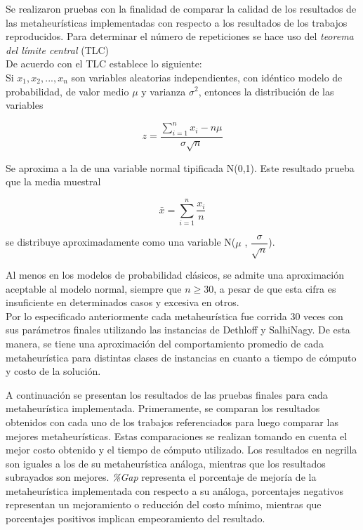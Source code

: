 Se realizaron pruebas con la finalidad de comparar la calidad de los resultados de las metaheurísticas im\-ple\-men\-ta\-das con respecto a los resultados de los trabajos reproducidos. Para determinar el número de repeticiones se hace uso del \textit{teorema del límite central} (TLC)\\

De acuerdo con \cite{TCL} el TLC establece lo siguiente:\\

Si $x_1,x_2,...,x_n$ son variables aleatorias independientes, con idéntico modelo de probabilidad, de valor medio $\mu$ y varianza $\sigma^2$, entonces la distribución de las variables 

\begin{equation}
z = \dfrac{\sum_{i=1}^n x_i - n \mu}{\sigma\sqrt{n}}
\end{equation}

Se aproxima a la de una variable normal tipificada N(0,1). Este resultado prueba que la media muestral 

\begin{equation}
\bar{x} = \sum_{i=1}^n \dfrac{x_i}{n}
\end{equation}

se distribuye aproximadamente como una variable N($\mu$ , $\dfrac{\sigma}{\sqrt{n}}$).

Al menos en los modelos de probabilidad clásicos, se admite una aproximación aceptable al modelo normal, siempre que $n \geqslant 30$, a pesar de que esta cifra es insuficiente en determinados casos y excesiva en otros.\\

Por lo especificado anteriormente cada metaheurística fue corrida 30 veces con sus parámetros finales utilizando las instancias de Dethloff y SalhiNagy. De esta manera, se tiene una aproximación del comportamiento promedio de cada metaheurística para distintas clases de instancias en cuanto a tiempo de cómputo y costo de la solución. 

A continuación se presentan los resultados de las pruebas finales para cada metaheurística implementada. Pri\-me\-ra\-men\-te, se comparan los resultados obtenidos con cada uno de los trabajos referenciados para luego comparar las mejores metaheurísticas. Estas comparaciones se realizan tomando en cuenta el mejor costo obtenido y el tiempo de cómputo utilizado. Los resultados en negrilla son iguales a los de su metaheurística análoga, mientras que los resultados subrayados son mejores. \emph{\%Gap} representa el porcentaje de mejoría de la metaheurística implementada con respecto a su análoga, porcentajes negativos representan un mejoramiento o reducción del costo mínimo, mientras que porcentajes positivos implican empeoramiento del resultado.

